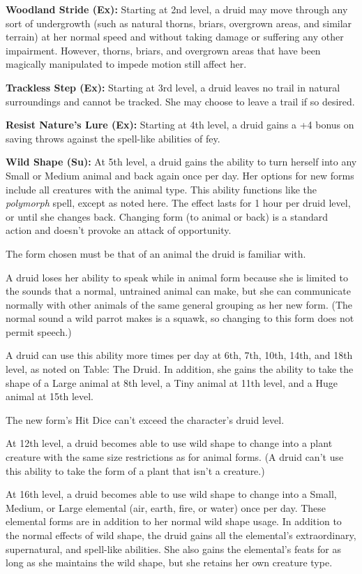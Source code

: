 \documentclass{article}
\begin{document}
\textbf{Woodland Stride (Ex):} Starting at 2nd level, a druid may move through 
any sort of undergrowth (such as natural thorns, briars, overgrown areas, and similar 
terrain) at her normal speed and without taking damage or suffering any other impairment. 
However, thorns, briars, and overgrown areas that have been magically manipulated 
to impede motion still affect her.

\textbf{Trackless Step (Ex):} Starting at 3rd level, a druid leaves no trail in 
natural surroundings and cannot be tracked. She may choose to leave a trail if 
so desired.

\textbf{Resist Nature's Lure (Ex):} Starting at 4th level, a druid gains a +4 bonus 
on saving throws against the spell-like abilities of fey.

\textbf{Wild Shape (Su):} At 5th level, a druid gains the ability to turn herself 
into any Small or Medium animal and back again once per day. Her options for new 
forms include all creatures with the animal type. This ability functions like the 
\textit{polymorph }spell, except as noted here. The effect lasts for 1 hour per 
druid level, or until she changes back. Changing form (to animal or back) is a 
standard action and doesn't provoke an attack of opportunity.

The form chosen must be that of an animal the druid is familiar with. 

A druid loses her ability to speak while in animal form because she is limited 
to the sounds that a normal, untrained animal can make, but she can communicate 
normally with other animals of the same general grouping as her new form. (The 
normal sound a wild parrot makes is a squawk, so changing to this form does not 
permit speech.)

A druid can use this ability more times per day at 6th, 7th, 10th, 14th, and 18th 
level, as noted on Table: The Druid\textit{. }In addition, she gains the ability 
to take the shape of a Large animal at 8th level, a Tiny animal at 11th level, 
and a Huge animal at 15th level.

The new form's Hit Dice can't exceed the character's druid level.

At 12th level, a druid becomes able to use wild shape to change into a plant creature 
with the same size restrictions as for animal forms. (A druid can't use this ability 
to take the form of a plant that isn't a creature.)

At 16th level, a druid becomes able to use wild shape to change into a Small, Medium, 
or Large elemental (air, earth, fire, or water) once per day. These elemental forms 
are in addition to her normal wild shape usage. In addition to the normal effects 
of wild shape, the druid gains all the elemental's extraordinary, supernatural, 
and spell-like abilities. She also gains the elemental's feats for as long as she 
maintains the wild shape, but she retains her own creature type.
\end{document}
